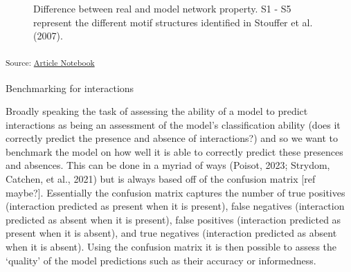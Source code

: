 \documentclass[
]{article}
\makeatletter
\let\oldparagraph\paragraph
\renewcommand{\paragraph}{
    \@ifstar
      \xxxParagraphStar
      \xxxParagraphNoStar
  }
\newcommand{\xxxParagraphStar}[1]{\oldparagraph*{#1}\mbox{}}
\newcommand{\xxxParagraphNoStar}[1]{\oldparagraph{#1}\mbox{}}
\makeatother
\begin{document}
\begin{figure}[H]


\caption{\label{fig-topology}Difference between real and model network
property. S1 - S5 represent the different motif structures identified in
Stouffer et al. (2007).}

\end{figure}%

\textsubscript{Source:
\href{https://BecksLab.github.io/ms_t_is_for_topology/index.qmd.html}{Article
Notebook}}

\paragraph{Benchmarking for
interactions}\label{benchmarking-for-interactions}

Broadly speaking the task of assessing the ability of a model to predict
interactions as being an assessment of the model's classification
ability (does it correctly predict the presence and absence of
interactions?) and so we want to benchmark the model on how well it is
able to correctly predict these presences and absences. This can be done
in a myriad of ways (Poisot, 2023; Strydom, Catchen, et al., 2021) but
is always based off of the confusion matrix {[}ref maybe?{]}.
Essentially the confusion matrix captures the number of true positives
(interaction predicted as present when it is present), false negatives
(interaction predicted as absent when it is present), false positives
(interaction predicted as present when it is absent), and true negatives
(interaction predicted as absent when it is absent). Using the confusion
matrix it is then possible to assess the `quality' of the model
predictions such as their accuracy or informedness.
\end{document}
